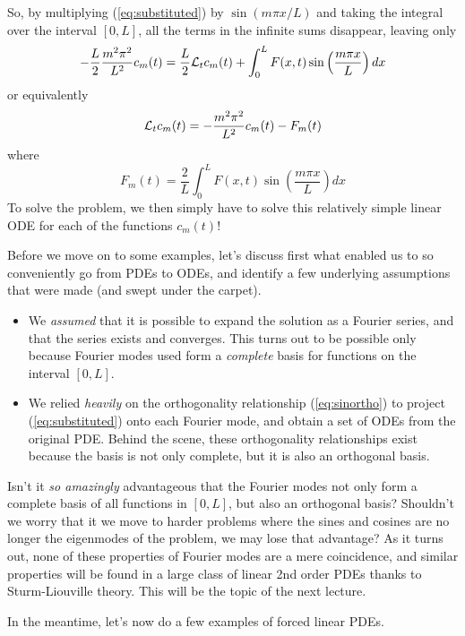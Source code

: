 So, by multiplying (\ref{eq:substituted}) by $\sin(m\pi x/L)$ and taking the integral over the interval $[0,L]$, all the terms in the infinite sums disappear, leaving only 
\begin{equation}
 - \frac{L}{2} \frac{m^2 \pi^2 }{L^2} c_m(t) =  \frac{L}{2} {\cal L}_t c_m(t) + \int_0^L F(x,t) \sin \left( \frac{m\pi x}{L} \right) dx
\end{equation}
or equivalently 
\begin{equation}
 {\cal L}_t c_m(t) = - \frac{m^2 \pi^2 }{L^2} c_m(t) - F_m(t) 
\end{equation}
where 
\begin{equation}
     F_m (t) = \frac{2}{L} \int_0^L F(x,t) \sin \left( \frac{m\pi x}{L} \right) dx 
\end{equation}
To solve the problem, we then simply have to solve this relatively simple linear ODE for each of the functions $c_m(t)$! 

Before we move on to some examples, let's discuss first what enabled us to so conveniently go from PDEs to ODEs, and identify a few underlying assumptions that were made (and swept under the carpet). \begin{itemize}
\item We {\it assumed} that it is possible to expand the solution as a Fourier series, and that the series exists and converges. This turns out to be possible only because Fourier modes used form a {\it complete} basis for functions on the interval $[0,L]$.
\item We relied {\it heavily} on the orthogonality relationship (\ref{eq:sinortho}) to project (\ref{eq:substituted}) onto each Fourier mode, and obtain a set of ODEs from the original PDE. Behind the scene, these orthogonality relationships exist because the basis is not only complete, but it is also an orthogonal basis. 
\end{itemize} 

Isn't it {\it so amazingly} advantageous that the Fourier modes not only form a complete basis of all functions in $[0,L]$, but also an orthogonal basis? Shouldn't we worry that it we move to harder problems where the sines and cosines are no longer the eigenmodes of the problem, we may lose that advantage? As it turns out, none of these properties of Fourier modes are a mere coincidence, and similar properties will be found in a large class of linear 2nd order PDEs thanks to Sturm-Liouville theory. This will be the topic of the next lecture. 

In the meantime, let's now do a few examples of forced linear PDEs.

